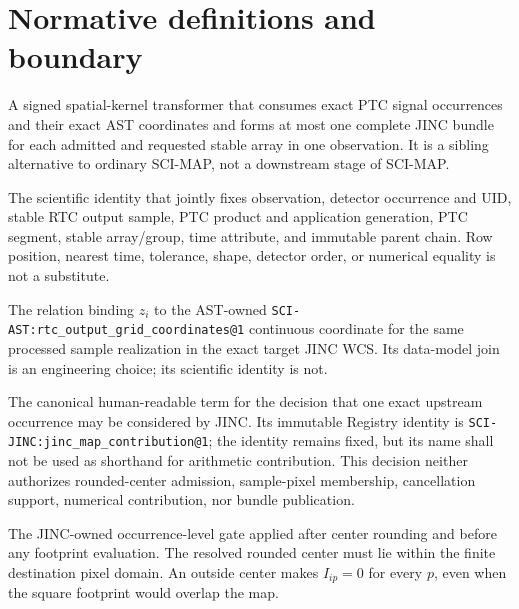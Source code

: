 \section{Normative definitions and boundary}
\label{sec:definitions}

\begin{description}[style=nextline,leftmargin=0pt,labelindent=0pt]
\item[SCI-JINC observation estimator.]
A signed spatial-kernel transformer that consumes exact PTC signal occurrences
and their exact AST coordinates and forms at most one complete JINC bundle for
each admitted and requested stable array in one observation.  It is a sibling
alternative to ordinary SCI-MAP, not a downstream stage of SCI-MAP.

\item[Exact occurrence.]
The scientific identity that jointly fixes observation, detector occurrence
and UID, stable RTC output sample, PTC product and application generation, PTC
segment, stable array/group, time attribute, and immutable parent chain.  Row
position, nearest time, tolerance, shape, detector order, or numerical equality
is not a substitute.

\item[Exact AST association.]
The relation binding $z_i$ to the AST-owned
\texttt{SCI-AST:rtc\_output\_grid\_coordinates@1} continuous coordinate for the
same processed sample realization in the exact target JINC WCS.  Its data-model
join is an engineering choice; its scientific identity is not.

\item[JINC upstream-occurrence admission.]
The canonical human-readable term for the decision that one exact upstream
occurrence may be considered by JINC.  Its immutable Registry identity is
\texttt{SCI-JINC:jinc\_map\_contribution@1}; the identity remains fixed, but
its name shall not be used as shorthand for arithmetic contribution.  This
decision neither authorizes rounded-center admission, sample-pixel
membership, cancellation support, numerical contribution, nor bundle
publication.

\item[Rounded-center domain admission.]
The JINC-owned occurrence-level gate applied after center rounding and before
any footprint evaluation.  The resolved rounded center must lie within the
finite destination pixel domain.  An outside center makes $I_{ip}=0$ for every
$p$, even when the square footprint would overlap the map.


\end{description}
